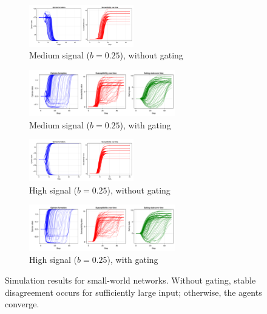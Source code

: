 \documentclass[]{article}
\begin{document}
\begin{figure}
	\begin{subfigure}{\linewidth}
		\centering
		\includegraphics[width=0.5\textwidth]{../plots/nvar0_nog_homd_medsig_g05_ws4_s92391} 
		\caption{Medium signal ($b = 0.25$), without gating}  \label{fig:ws11}
	\end{subfigure}
	
	\begin{subfigure}{\linewidth}
		\centering
		\includegraphics[width=0.7\textwidth]{../plots/nvar0_wg_homd_medsig_g05_ws4_a2_taux5_s92391}
		\caption{Medium signal ($b = 0.25$), with gating} \label{fig:ws12}
	\end{subfigure}
	
	\begin{subfigure}{\linewidth}
		\centering
		\includegraphics[width=0.5\textwidth]{../plots/nvar0_nog_homd_hisig_g05_ws4_s92391} 
		\caption{High signal ($b = 0.25$), without gating}  \label{fig:ws21}
	\end{subfigure}
	
	\begin{subfigure}{\linewidth}
		\centering
		\includegraphics[width=0.7\textwidth]{../plots/nvar0_wg_homd_hisig_g05_ws4_a2_taux5_s92391}
		\caption{High signal ($b = 0.25$), with gating} \label{fig:ws22}
	\end{subfigure}
	\caption{Simulation results for small-world networks. Without gating, stable disagreement occurs for sufficiently large input; otherwise, the agents converge.}
	\label{fig:wsgraph}
\end{figure}
\end{document}
